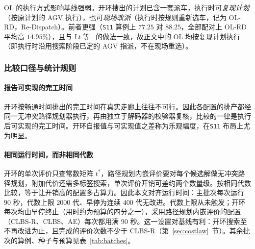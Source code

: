 \documentclass[manuscript,screen,review]{acmart}
\begin{document}
OL 的执行方式影响基线强弱。开环搜出的计划已含一套派车，执行时可\emph{复现计划}（按原计划的 AGV 执行），也可\emph{现场改派}（执行时按规则重新选车，记为 OL-RD，Re-Dispatch）。前者更强（\texttt{S11} 算例上 $77.25$ 对 $88.25$，全部配对上 OL-RD 平均高 $14.95\%$），且与 Li 等~\cite{li2026framework} 的做法一致，故正文中的 OL 均按复现计划执行（即执行时沿用搜索阶段已定的 AGV 指派，不在现场重选）。

\subsubsection{比较口径与统计规则}
\label{sec:protocol}

\paragraph{报告可实现的完工时间}
开环按畅通时间排出的完工时间在真实走廊上往往不可行。因此各配置的排产都经同一无冲突路径规划器执行，再由独立于解码器的校验器复核，比较的一律是执行后可实现的完工时间。开环自报值与可实现值之差称为乐观幅度，在\texttt{S11} 布局上尤为明显。

\paragraph{相同运行时间，而非相同代数}
开环的单次评价只查常数矩阵 $t^{*}$，路径规划内嵌评价要对每个候选解做无冲突路径规划，附加代价还需多标签搜索，单次评价开销可差约两个数量级。按相同代数比较，等于让开销高的配置多占算力。因此本文对齐运行时间：主批次每次运行 $90$ 秒，代数上限 $2000$ 代、早停为连续 $400$ 代无改进。代数上限从未触发；开环每次均由早停终止（用时约为预算的四分之一），采用路径规划内嵌评价的配置（CLBS-R、CLBS、AE）每次都用满 $90$ 秒。这一设置对基线有利：开环搜索至不再改进为止，且完成的评价次数不少于 CLBS-R（第~\ref{sec:costlaw}~节）。其余批次的算例、种子与预算见表~\ref{tab:batches}。
\end{document}
